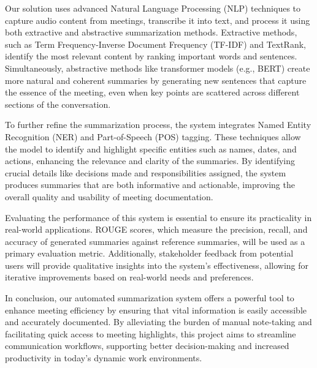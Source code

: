 \documentclass{article}
\begin{document}
Our solution uses advanced Natural Language Processing (NLP) techniques to capture audio content from meetings, transcribe it into text, and process it using both extractive and abstractive summarization methods. Extractive methods, such as Term Frequency-Inverse Document Frequency (TF-IDF) and TextRank, identify the most relevant content by ranking important words and sentences. Simultaneously, abstractive methods like transformer models (e.g., BERT) create more natural and coherent summaries by generating new sentences that capture the essence of the meeting, even when key points are scattered across different sections of the conversation.

To further refine the summarization process, the system integrates Named Entity Recognition (NER) and Part-of-Speech (POS) tagging. These techniques allow the model to identify and highlight specific entities such as names, dates, and actions, enhancing the relevance and clarity of the summaries. By identifying crucial details like decisions made and responsibilities assigned, the system produces summaries that are both informative and actionable, improving the overall quality and usability of meeting documentation.


Evaluating the performance of this system is essential to ensure its practicality in real-world applications. ROUGE scores, which measure the precision, recall, and accuracy of generated summaries against reference summaries, will be used as a primary evaluation metric. Additionally, stakeholder feedback from potential users will provide qualitative insights into the system's effectiveness, allowing for iterative improvements based on real-world needs and preferences.

In conclusion, our automated summarization system offers a powerful tool to enhance meeting efficiency by ensuring that vital information is easily accessible and accurately documented. By alleviating the burden of manual note-taking and facilitating quick access to meeting highlights, this project aims to streamline communication workflows, supporting better decision-making and increased productivity in today’s dynamic work environments.
\end{document}
